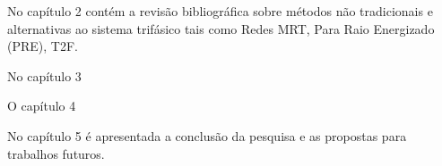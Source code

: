 \documentclass[oneside,openright,12pt]{ufsm_2021} %
\begin{document}
\par No capítulo 2 contém a revisão bibliográfica sobre métodos não tradicionais e alternativas ao sistema trifásico tais como Redes MRT, Para Raio Energizado (PRE), T2F.
\par No capítulo 3 
\par O capítulo 4
\par No capítulo 5 é apresentada a conclusão da pesquisa e as propostas para trabalhos futuros.


\startbibliography %

\end{document}
